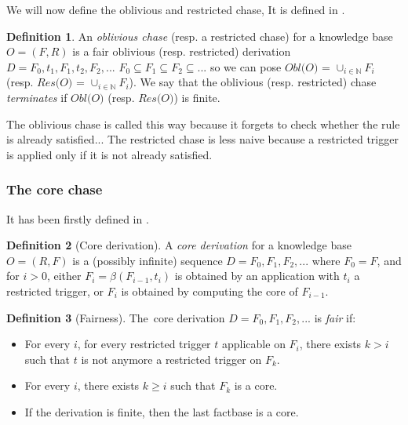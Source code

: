 \documentclass{article}
\theoremstyle{definition}
\newtheorem{definition}{Definition}[section]
\theoremstyle{remark}
\def \N {\mathbb N}
\begin{document}
We will now define the oblivious and restricted chase, It is defined in \cite{obl_res}.


\begin{definition}
An \emph{oblivious chase} (resp. a restricted chase) for a knowledge base $O= (F,R)$ is a fair oblivious (resp. restricted) derivation $D=F_0,t_1,F_1,t_2,F_2,...$ $F_0 \subseteq F_1 \subseteq F_2 \subseteq ...$ so we can pose \emph{$\textit{Obl(O)}$} = $\cup_{i \in \N}F_i$ (resp. \emph{$\textit{Res(O)}$} = $\cup_{i \in \N}F_i$).
We say that the oblivious (resp. restricted) chase \emph{terminates} if $\textit{Obl(O)}$ (resp. $\textit{Res(O)}$) is finite.
\end{definition}


The oblivious chase is called this way because it forgets to check whether the rule is already satisfied... The restricted chase is less naive because a restricted trigger is applied only if it is not already satisfied.


\subsubsection{The core chase}

It has been firstly defined in \cite{core_chase}.

\begin{definition}[Core derivation]
A \emph{core derivation} for a knowledge base $O = (R,F)$ is a (possibly infinite) sequence $D = F_0, F_1, F_2, ...$ where $F_0 = F$, and for $i >0$, either $F_{i}= \beta(F_{i-1},t_i)$ is obtained by an application with $t_i$ a restricted trigger, or $F_i$ is obtained by computing the core of $F_{i-1}$. 
\end{definition} 

\begin{definition}[Fairness]
The\ core derivation $D=F_0,F_1,F_2,...$ is \emph{fair} if:
\begin{itemize}
\item For every $i$, for every restricted trigger $t$ applicable on $F_i$, there exists $k > i$ such that $t$ is not anymore a restricted trigger on $F_k$.
\item For every $i$, there exists $k \geq i$ such that $F_k$ is a core.
\item If the derivation is finite, then the last factbase is a core.
\end{itemize}
\end{definition}
\end{document}
